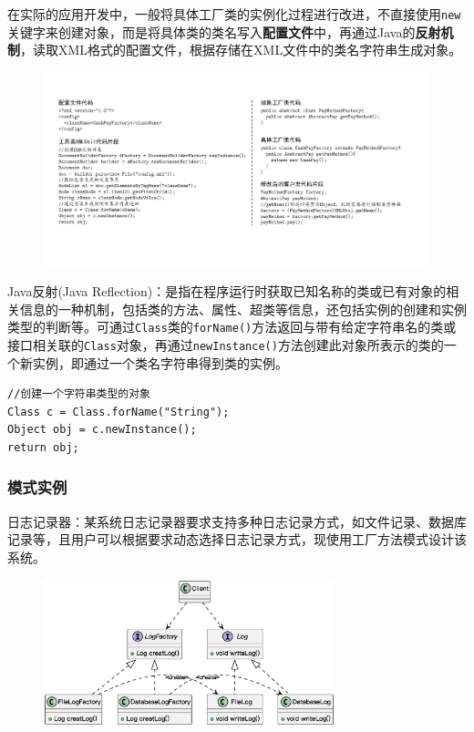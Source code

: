 在实际的应用开发中，一般将具体工厂类的实例化过程进行改进，不直接使用\;\verb|new|\;关键字来创建对象，而是将具体类的类名写入\textbf{配置文件}中，再通过Java的\textbf{反射机制}，读取XML格式的配置文件，根据存储在XML文件中的类名字符串生成对象。
\begin{figure}[H]
    \vspace{-0.5em}
	\centering
	\includegraphics[width=\textwidth]{images/工厂模式分析.pdf}
    \vspace{-2em}
\end{figure}

\vspace{-0.5em}
\begin{shaded}
Java反射(Java Reflection)：是指在程序运行时获取已知名称的类或已有对象的相关信息的一种机制，包括类的方法、属性、超类等信息，还包括实例的创建和实例类型的判断等。可通过\;\verb|Class|\;类的\;\verb|forName()|\;方法返回与带有给定字符串名的类或接口相关联的\;\verb|Class|\;对象，再通过\;\verb|newInstance()|\;方法创建此对象所表示的类的一个新实例，即通过一个类名字符串得到类的实例。
\begin{lstlisting}
//创建一个字符串类型的对象
Class c = Class.forName("String");
Object obj = c.newInstance();
return obj;
\end{lstlisting}
\end{shaded}
\vspace{-1em}

\subsubsection{模式实例}
日志记录器：某系统日志记录器要求支持多种日志记录方式，如文件记录、数据库记录等，且用户可以根据要求动态选择日志记录方式，现使用工厂方法模式设计该系统。
\begin{figure}[H]
    \vspace{-0.5em}
	\centering
	\includegraphics[width=0.75\textwidth]{images/工厂模式实例.eps}
    \vspace{-1em}
\end{figure}

